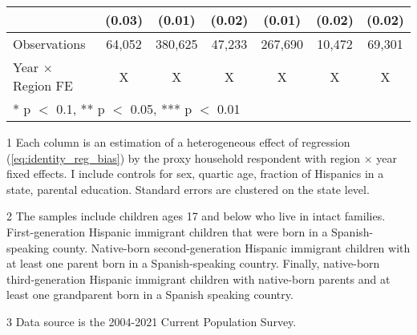 \begin{table}[!h]
{\begin{threeparttable}
\begin{tabular}[t]{lcccccc}
 & (0.03) & (0.01) & (0.02) & (0.01) & (0.02) & (0.02)\\
\midrule
Observations & 64,052 & 380,625 & 47,233 & 267,690 & 10,472 & 69,301\\
Year $\times$ Region FE & X & X & X & X & X & X\\
\bottomrule
\multicolumn{7}{l}{\rule{0pt}{1em}* p $<$ 0.1, ** p $<$ 0.05, *** p $<$ 0.01}\\
\end{tabular}
\begin{tablenotes}
\small
\item[1] \footnotesize{Each column is an estimation of a heterogeneous effect of regression (\ref{eq:identity_reg_bias}) by 
                      the proxy household respondent with region × year fixed effects. 
                      I include controls for sex, quartic age, fraction of Hispanics in a state, parental education.
                      Standard errors are clustered on the state level.}
\item[2] \footnotesize{The samples include children ages 17 and below who live in intact families. 
                      First-generation Hispanic immigrant children that were born in a 
                      Spanish-speaking county. Native-born second-generation Hispanic 
                      immigrant children with at least one parent born in a Spanish-speaking 
                      country. Finally, native-born third-generation Hispanic immigrant children 
                      with native-born parents and at least one grandparent born in a Spanish 
                      speaking country.}
\item[3] \footnotesize{Data source is the 2004-2021 Current Population Survey.}
\end{tablenotes}
\end{threeparttable}}
\end{table}
